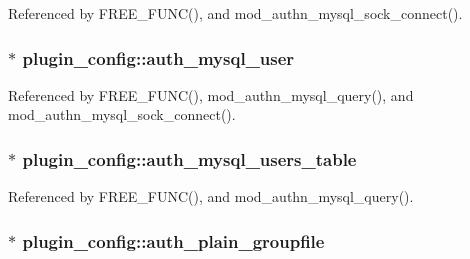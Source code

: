 Referenced by F\-R\-E\-E\-\_\-\-F\-U\-N\-C(), and mod\-\_\-authn\-\_\-mysql\-\_\-sock\-\_\-connect().

\hypertarget{structplugin__config_a6e4ad8a4887419e898e7527d100e7903}{
\subsubsection[{auth\-\_\-mysql\-\_\-user}]{$\ast$ plugin\-\_\-config\-::auth\-\_\-mysql\-\_\-user}}\label{structplugin__config_a6e4ad8a4887419e898e7527d100e7903}


Referenced by F\-R\-E\-E\-\_\-\-F\-U\-N\-C(), mod\-\_\-authn\-\_\-mysql\-\_\-query(), and mod\-\_\-authn\-\_\-mysql\-\_\-sock\-\_\-connect().

\hypertarget{structplugin__config_a6f1ae54516b011db08bcb2df295840e5}{
\subsubsection[{auth\-\_\-mysql\-\_\-users\-\_\-table}]{$\ast$ plugin\-\_\-config\-::auth\-\_\-mysql\-\_\-users\-\_\-table}}\label{structplugin__config_a6f1ae54516b011db08bcb2df295840e5}


Referenced by F\-R\-E\-E\-\_\-\-F\-U\-N\-C(), and mod\-\_\-authn\-\_\-mysql\-\_\-query().

\hypertarget{structplugin__config_a7f4d7b466ffa9ac5635a79d182e4bbd9}{
\subsubsection[{auth\-\_\-plain\-\_\-groupfile}]{$\ast$ plugin\-\_\-config\-::auth\-\_\-plain\-\_\-groupfile}}\label{structplugin__config_a7f4d7b466ffa9ac5635a79d182e4bbd9}


